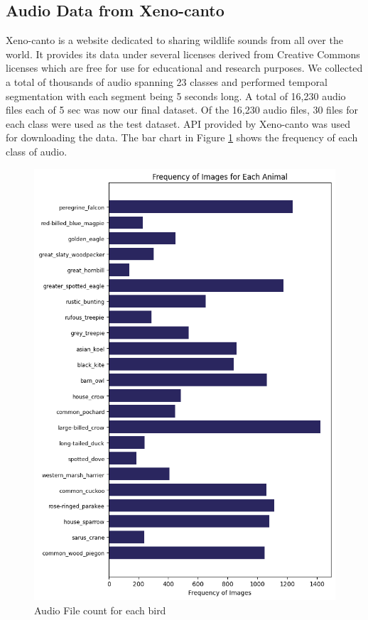 \documentclass[fleqn, 10pt, twoside]{IOEGC}
\begin{document}
\subsection{Audio Data from Xeno-canto}
Xeno-canto is a website dedicated to sharing wildlife sounds from all over the world. It provides its data under several licenses derived from Creative Commons licenses which are free for use for educational and research purposes. We collected a total of thousands of audio spanning 23 classes and performed temporal segmentation with each segment being 5 seconds long. A total of 16,230 audio files each of 5 sec was now our final dataset. Of the 16,230 audio files, 30 files for each class were used as the test dataset.
API provided by Xeno-canto was used for downloading the data. The bar chart in Figure \ref{audio_file_count_bird} shows the frequency of each class of audio.

	{

		\begin{figure}
			\centering
			\includegraphics[scale=0.5]{Graphics/xenocanto.png}
			\caption{Audio File count for each bird}
			\label{audio_file_count_bird}
		\end{figure}

	}
\end{document}
